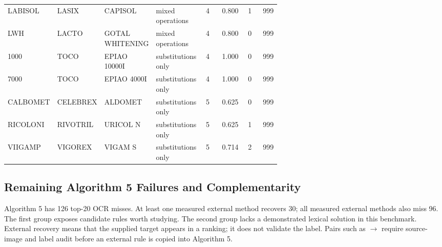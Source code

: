 \begin{scriptsize}
\begin{longtable}{@{}L{0.14\linewidth}L{0.16\linewidth}L{0.17\linewidth}L{0.15\linewidth}rrrr@{}}
LABISOL & LASIX & CAPISOL & mixed operations & 4 & 0.800 & 1 & 999 \\
LWH & LACTO & GOTAL WHITENING & mixed operations & 4 & 0.800 & 0 & 999 \\
1000 & TOCO & EPIAO 10000I & substitutions only & 4 & 1.000 & 0 & 999 \\
7000 & TOCO & EPIAO 4000I & substitutions only & 4 & 1.000 & 0 & 999 \\
CALBOMET & CELEBREX & ALDOMET & substitutions only & 5 & 0.625 & 0 & 999 \\
RICOLONI & RIVOTRIL & URICOL N & substitutions only & 5 & 0.625 & 1 & 999 \\
VIIGAMP & VIGOREX & VIGAM S & substitutions only & 5 & 0.714 & 2 & 999 \\
\bottomrule
\end{longtable}
\end{scriptsize}

\subsection{Remaining Algorithm 5 Failures and Complementarity}
Algorithm 5 has 126 top-20 OCR misses. At least one measured external method recovers 30; all measured external methods also miss 96. The first group exposes candidate rules worth studying. The second group lacks a demonstrated lexical solution in this benchmark. External recovery means that the supplied target appears in a ranking; it does not validate the label. Pairs such as $\rightarrow$ require source-image and label audit before an external rule is copied into Algorithm 5.

